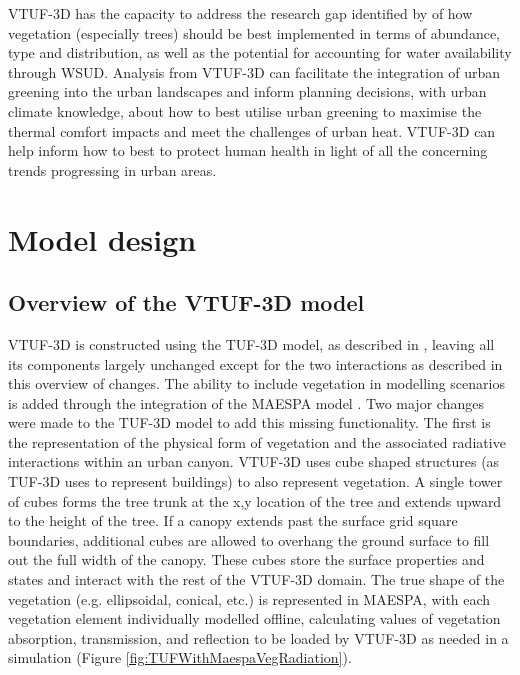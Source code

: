 \documentclass[final,3p,times,authoryear]{elsarticle}
\begin{document}
VTUF-3D has the capacity to address the research gap identified by \cite{Bowler2010} of how vegetation (especially trees) should be best implemented in terms of abundance, type and distribution, as well as the potential for accounting for water availability through WSUD. Analysis from VTUF-3D can facilitate the integration of urban greening into the urban landscapes and inform planning decisions, with urban climate knowledge, about how to best utilise urban greening to maximise the thermal comfort impacts and meet the challenges of urban heat. VTUF-3D can help inform how to best to protect human health in light of all the concerning trends progressing in urban areas.

\section{Model design}\label{sec:method}

\subsection{Overview of the VTUF-3D model}\label{sec:DesignOverview}

VTUF-3D is constructed using the TUF-3D model, as described in \cite{Krayenhoff2007}, leaving all its components largely unchanged except for the two interactions as described in this overview of changes. The ability to include vegetation in modelling scenarios is added through the integration of the MAESPA model \citep{Duursma2012}. Two major changes were made to the TUF-3D model to add this missing functionality. The first is the representation of the physical form of vegetation and the associated radiative interactions within an urban canyon. VTUF-3D uses cube shaped structures (as TUF-3D uses to represent buildings) to also represent vegetation. A single tower of cubes forms the tree trunk at the x,y location of the tree and extends upward to the height of the tree. If a canopy extends past the surface grid square boundaries, additional cubes are allowed to overhang the ground surface to fill out the full width of the canopy. These cubes store the surface properties and states and interact with the rest of the VTUF-3D domain. The true shape of the vegetation (e.g. ellipsoidal, conical, etc.) is represented in MAESPA, with each vegetation element individually modelled offline, calculating values of vegetation absorption, transmission, and reflection to be loaded by VTUF-3D as needed in a simulation (Figure \ref{fig:TUFWithMaespaVegRadiation}).
\end{document}
